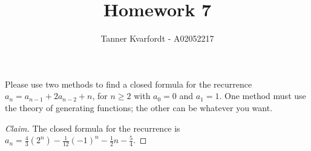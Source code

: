 \documentclass[12pt]{article}
\newenvironment{problem}[2][Problem]{\begin{trivlist}
\item[\hskip \labelsep {\bfseries #1}\hskip \labelsep {\bfseries #2.}]}{\end{trivlist}}
\begin{document}
 
 
\title{Homework 7}
\author{Tanner Kvarfordt - A02052217}
\maketitle
 
\begin{problem}{1}
Please use two methods to find a closed formula for the recurrence $a_n = a_{n-1} + 2a_{n-2}+n$, for $n \geq 2$ with $a_0=0$ and $a_1=1$. One method must use the theory of generating functions; the other can be whatever you want.
\end{problem}
 
\begin{proof}[Claim]
The closed formula for the recurrence is $a_n=\frac{4}{3}(2^n)-\frac{1}{12}(-1)^n-\frac{1}{2}n - \frac{5}{4}$.
\end{proof}
\end{document}
